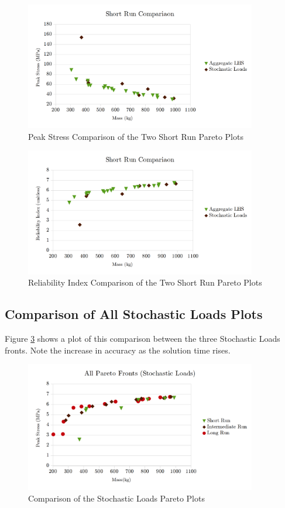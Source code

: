 \begin{figure}[!htbp]
\includegraphics[width=0.9\textwidth]{img/pf_comp_short.png}
\caption{Peak Stress Comparison of the Two Short Run Pareto Plots}
\label{fig:pfront_comp_short}
\end{figure}

\begin{figure}[!htbp]
\includegraphics[width=0.9\textwidth]{img/pf_comp_short_beta.png}
\caption{Reliability Index Comparison of the Two Short Run Pareto Plots}
\label{fig:pfront_comp_short_beta}
\end{figure}
\subsection{Comparison of All Stochastic Loads Plots}
Figure \ref{fig:pfront_comp_sto} shows a plot of this comparison between the three Stochastic Loads fronts. Note the increase in accuracy as the solution time rises. 

\begin{figure}[!htbp]
\includegraphics[width=0.9\textwidth]{img/pf_comp_sto.png}
\caption{Comparison of the Stochastic Loads Pareto Plots}
\label{fig:pfront_comp_sto}
\end{figure}

